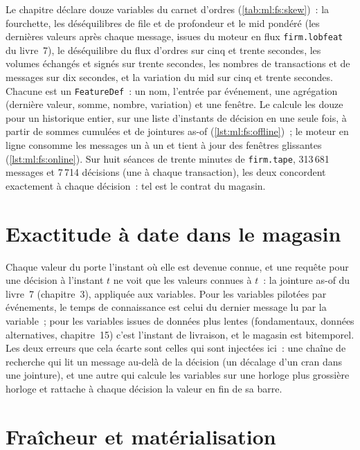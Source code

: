 Le chapitre déclare douze variables du carnet d'ordres (\cref{tab:ml:fs:skew})~: la fourchette, les déséquilibres de file et de profondeur
et le mid pondéré (les dernières valeurs après chaque message, issues du moteur en flux \texttt{firm.lobfeat} du livre~7), le déséquilibre du flux
d'ordres sur cinq et trente secondes, les volumes échangés et signés sur trente secondes, les nombres de transactions et de messages sur dix secondes, et
la variation du mid sur cinq et trente secondes. Chacune est un \texttt{FeatureDef}~: un nom, l'entrée par événement, une agrégation (dernière
valeur, somme, nombre, variation) et une fenêtre. Le  calcule les douze pour un historique entier, sur une liste d'instants de décision
en une seule fois, à partir de sommes cumulées et de jointures as-of (\cref{lst:ml:fs:offline})~; le moteur en ligne consomme les messages un à un
et tient à jour des fenêtres glissantes (\cref{lst:ml:fs:online}). Sur huit séances de trente minutes de \texttt{firm.tape}, 313\,681 messages
et 7\,714 décisions (une à chaque transaction), les deux concordent exactement à chaque décision~: tel est le contrat du magasin.

\section{Exactitude à date dans le magasin}

Chaque valeur du  porte l'instant où elle est devenue connue, et une requête pour une décision à l'instant $t$ ne voit que les valeurs
connues à $t$~: la jointure as-of du livre~7 (chapitre~3), appliquée aux variables. Pour les variables pilotées par événements, le temps de connaissance est
celui du dernier message lu par la variable~; pour les variables issues de données plus lentes (fondamentaux, données alternatives, chapitre~15)
c'est l'instant de livraison, et le magasin est bitemporel. Les deux erreurs que cela écarte sont celles qui sont injectées ici~: une chaîne de recherche
qui lit un message au-delà de la décision (un décalage d'un cran dans une jointure), et une autre qui calcule les variables sur une horloge plus grossière
horloge et rattache à chaque décision la valeur en fin de sa barre.

\section{Fraîcheur et matérialisation}


